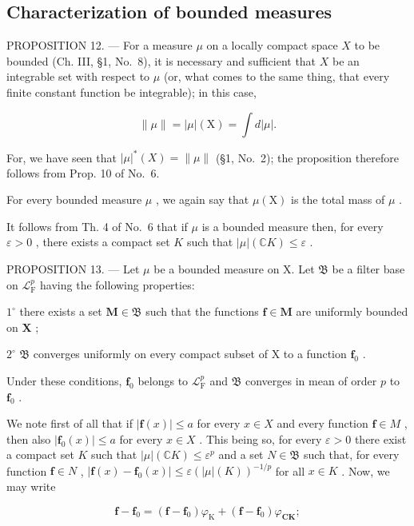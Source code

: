 \subsection{Characterization of bounded measures}

PROPOSITION 12. --- For a measure \(\mu\) on a locally compact space \(X\) to be bounded (Ch. III, §1, No.~8), it is necessary and sufficient that \(X\) be an integrable set with respect to \(\mu\) (or, what comes to the same thing, that every finite constant function be integrable); in this case,

\[
\| \mu \| = | \mu | (\mathrm{X}) = \int d | \mu |.
\]

For, we have seen that \(|\mu|^{*}(X) = \|\mu\|\) (§1, No.~2); the proposition therefore follows from Prop. 10 of No.~6.

For every bounded measure \(\mu\) , we again say that \(\mu(\mathrm{X})\) is the total mass of \(\mu\) .

It follows from Th. 4 of No.~6 that if \(\mu\) is a bounded measure then, for every \(\varepsilon > 0\) , there exists a compact set \(K\) such that \(|\mu| (\mathbb{C}K) \leqslant \varepsilon\) .

PROPOSITION 13. --- Let \(\mu\) be a bounded measure on X. Let \(\mathfrak{B}\) be a filter base on \(\mathcal{L}_{\mathrm{F}}^{p}\) having the following properties:

\(1^{\circ}\) there exists a set \(\mathbf{M} \in \mathfrak{B}\) such that the functions \(\mathbf{f} \in \mathbf{M}\) are uniformly bounded on \(\mathbf{X}\) ;

\(2^{\circ}\) \(\mathfrak{B}\) converges uniformly on every compact subset of X to a function \(\mathbf{f}_0\) .

Under these conditions, \(\mathbf{f}_0\) belongs to \(\mathcal{L}_{\mathrm{F}}^{p}\) and \(\mathfrak{B}\) converges in mean of order \(p\) to \(\mathbf{f}_0\) .

We note first of all that if \(|\mathbf{f}(x)| \leqslant a\) for every \(x \in X\) and every function \(\mathbf{f} \in M\) , then also \(|\mathbf{f}_0(x)| \leqslant a\) for every \(x \in X\) . This being so, for every \(\varepsilon > 0\) there exist a compact set \(K\) such that \(|\mu|(\mathbb{C}K) \leqslant \varepsilon^p\) and a set \(N \in \mathfrak{B}\) such that, for every function \(\mathbf{f} \in N\) , \(|\mathbf{f}(x) - \mathbf{f}_0(x)| \leqslant \varepsilon(|\mu|(K))^{-1/p}\) for all \(x \in K\) . Now, we may write

\[
\mathbf {f} - \mathbf {f} _ {0} = (\mathbf {f} - \mathbf {f} _ {0}) \varphi_ {\mathrm{K}} + (\mathbf {f} - \mathbf {f} _ {0}) \varphi_ {\mathbf {C K}};
\]

